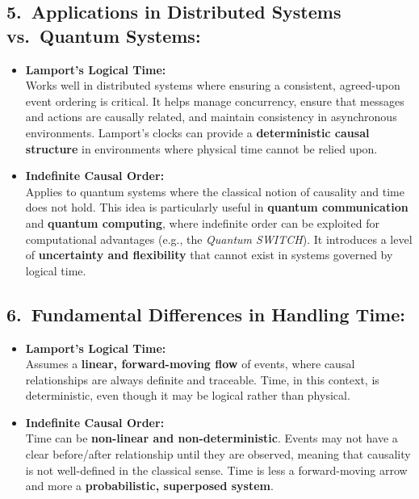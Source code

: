 \subsection*{5.\ Applications in Distributed Systems vs.\ Quantum Systems:}

\begin{itemize}[leftmargin=1.5em]
\item \textbf{Lamport’s Logical Time:}\\
  Works well in distributed systems where ensuring a consistent, agreed-upon event ordering is critical. It helps manage concurrency, ensure that messages and actions are causally related, and maintain consistency in asynchronous environments. Lamport’s clocks can provide a \textbf{deterministic causal structure} in environments where physical time cannot be relied upon.
\item \textbf{Indefinite Causal Order:}\\
  Applies to quantum systems where the classical notion of causality and time does not hold. This idea is particularly useful in \textbf{quantum communication} and \textbf{quantum computing}, where indefinite order can be exploited for computational advantages (e.g., the \emph{Quantum SWITCH}). It introduces a level of \textbf{uncertainty and flexibility} that cannot exist in systems governed by logical time.
\end{itemize}

\subsection*{6.\ Fundamental Differences in Handling Time:}

\begin{itemize}[leftmargin=1.5em]
\item \textbf{Lamport’s Logical Time:}\\
  Assumes a \textbf{linear, forward-moving flow} of events, where causal relationships are always definite and traceable. Time, in this context, is deterministic, even though it may be logical rather than physical.
\item \textbf{Indefinite Causal Order:}\\
  Time can be \textbf{non-linear and non-deterministic}. Events may not have a clear before/after relationship until they are observed, meaning that causality is not well-defined in the classical sense. Time is less a forward-moving arrow and more a \textbf{probabilistic, superposed system}.
\end{itemize}

